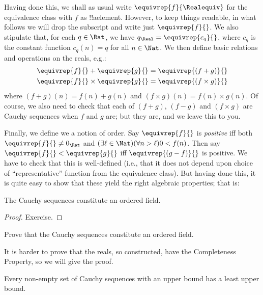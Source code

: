 \documentclass[../../../include/open-logic-section]{subfiles}
\begin{document}
Having done this, we shall as usual write $\equivrep{f}{\Realequiv}$
for the equivalence class with $f$ as !!a{element}. However, to keep
things readable, in what follows we will drop the subscript and write
just $\equivrep{f}{}$. We also stipulate that, for each $q \in \Rat$,
we have $q_{\Real} = \equivrep{c_{q}}{}$, where $c_{q}$ is the
constant function $c_q(n) = q$ for all $n \in \Nat$. We then define
basic relations and operations on the reals, e.g.:
\begin{align*}
	\equivrep{f}{} + \equivrep{g}{} &= 	\equivrep{(f + g)}{} \\
	\equivrep{f}{} \times 	\equivrep{g}{} &= \equivrep{(f \times g)}{} 
\end{align*}
where $(f + g)(n) = f(n) + g(n)$ and $(f \times g)(n) = f(n) \times
g(n)$. Of course, we also need to check that each of  $(f + g)$,
$(f-g)$ and $(f\times g)$ are Cauchy sequences when $f$ and $g$ are;
but they are, and we leave this to you.

Finally, we define we a notion of order. Say $\equivrep{f}{}$ is
\emph{positive} iff both $\equivrep{f}{}\neq 0_\Rat$ and $(\exists
\ell \in \Nat)(\forall n > \ell)0 < f(n)$. Then say $\equivrep{f}{} <
\equivrep{g}{}$ iff $\equivrep{(g - f)}{}$ is positive. We have to
check that this is well-defined (i.e., that it does not depend upon
choice of ``representative'' function from the equivalence class). 
But having done this, it is quite easy to show that these yield the
right algebraic properties; that is:
\begin{thm}
The Cauchy sequences constitute an ordered field.
\end{thm}

\begin{proof}
Exercise. 
\end{proof}

\begin{prob}
Prove that the Cauchy sequences constitute an ordered field.
\end{prob}

It is harder to prove that the reals, so constructed, have the
Completeness Property, so we will give the proof.

\begin{thm}
Every non-empty set of Cauchy sequences with an upper bound has a
least upper bound.
\end{thm}
\end{document}
